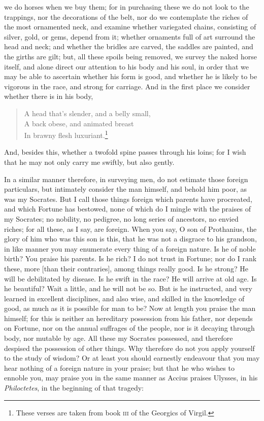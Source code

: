 \documentclass[12pt]{article}
\begin{document}
we do horses when we buy them; for in purchasing these we do not look to the
trappings, nor the decorations of the belt, nor do we contemplate the riches of
the most ornamented neck, and examine whether variegated chains, consisting of
silver, gold, or gems, depend from it; whether ornaments full of art surround
the head and neck; and whether the bridles are carved, the saddles are painted,
and the girths are gilt; but, all these spoils being removed, we survey the
naked horse itself, and alone direct our attention to his body and his soul, in
order that we may be able to ascertain whether his form is good, and whether he
is likely to be vigorous in the race, and strong for carriage. And in the first
place we consider whether there is in his body,

\begin{verse}
A head that's slender, and a belly small,\\
A back obese, and animated breast\\
In brawny flesh luxuriant.\footnote{These verses are taken from book
\textsc{iii} of the Georgics of Virgil.}
\end{verse}

\noindent And, besides this, whether a twofold spine passes through his loins;
for I wish that he may not only carry me swiftly, but also gently.

In a similar manner therefore, in surveying men, do not estimate those foreign
particulars, but intimately consider the man himself, and behold him poor, as
was my Socrates. But I call those things foreign which parents have procreated,
and which Fortune has bestowed, none of which do I mingle with the praises of
my Socrates; no nobility, no pedigree, no long series of ancestors, no envied
riches; for all these, as I say, are foreign. When you say, O son of
Prothanius, the glory of him who was this son is this, that he was not a
disgrace to his grandson, in like manner you may enumerate every thing of a
foreign nature. Is he of noble birth? You praise his parents. Is he rich? I do
not trust in Fortune; nor do I rank these, more [than their contraries], among
things really good. Is he strong? He will be debilitated by disease. Is he
swift in the race? He will arrive at old age. Is he beautiful? Wait a little,
and he will not be so. But is he instructed, and very learned in excellent
disciplines, and also wise, and skilled in the knowledge of good, as much as it
is possible for man to be? Now at length you praise the man himself; for this
is neither an hereditary possession from his father, nor depends on Fortune,
nor on the annual suffrages of the people, nor is it decaying through body, nor
mutable by age. All these my Socrates possessed, and therefore despised the
possession of other things. Why therefore do not you apply yourself to the
study of wisdom? Or at least you should earnestly endeavour that you may hear
nothing of a foreign nature in your praise; but that he who wishes to ennoble
you, may praise you in the same manner as Accius praises Ulysses, in his
\textit{Philoctetes}, in the beginning of that tragedy:
\end{document}
